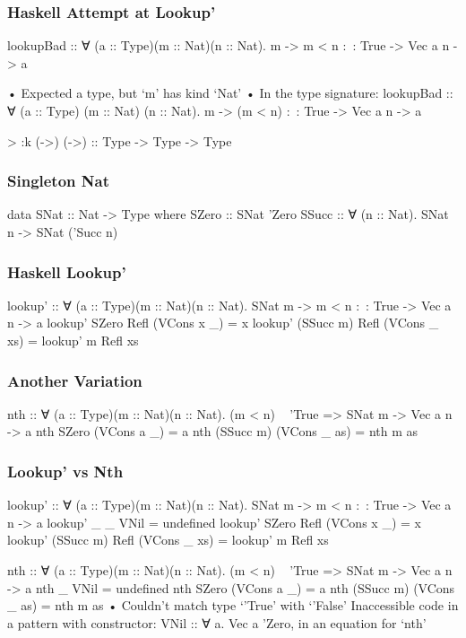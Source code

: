 \documentclass{beamer}
\begin{document}
\begin{frame}[fragile]\frametitle{Haskell Attempt at Lookup'}
\begin{semiverbatim}
lookupBad :: ∀ (a :: Type)(m :: Nat)(n :: Nat).
             m -> m < n :~: True -> Vec a n -> a

  • Expected a type, but ‘m’ has kind ‘Nat’
  • In the type signature:
      lookupBad :: ∀ (a :: Type) (m :: Nat) (n :: Nat).
                   m -> (m < n) :~: True -> Vec a n -> a

> :k (->)
(->) :: Type -> Type -> Type
\end{semiverbatim}
\end{frame}

\begin{frame}[fragile]\frametitle{Singleton Nat}
\begin{semiverbatim}
data SNat :: Nat -> Type where
  SZero :: SNat 'Zero
  SSucc :: ∀ (n :: Nat). SNat n -> SNat ('Succ n)
\end{semiverbatim}
\end{frame}

\begin{frame}[fragile]\frametitle{Haskell Lookup'}
\begin{semiverbatim}
lookup' :: ∀ (a :: Type)(m :: Nat)(n :: Nat).
           SNat m -> m < n :~: True -> Vec a n -> a
lookup' SZero     Refl (VCons x _)  = x
lookup' (SSucc m) Refl (VCons _ xs) = lookup' m Refl xs
\end{semiverbatim}
\end{frame}

\begin{frame}[fragile]\frametitle{Another Variation}
\begin{semiverbatim}
nth :: ∀ (a :: Type)(m :: Nat)(n :: Nat).
       (m < n) ~ 'True => SNat m -> Vec a n -> a
nth SZero     (VCons a _)  = a
nth (SSucc m) (VCons _ as) = nth m as
\end{semiverbatim}
\end{frame}

\begin{frame}[fragile]\frametitle{Lookup' vs Nth}
\begin{semiverbatim}
lookup' :: ∀ (a :: Type)(m :: Nat)(n :: Nat).
           SNat m -> m < n :~: True -> Vec a n -> a
lookup' _         _     VNil        = undefined
lookup' SZero     Refl (VCons x _)  = x
lookup' (SSucc m) Refl (VCons _ xs) = lookup' m Refl xs

nth :: ∀ (a :: Type)(m :: Nat)(n :: Nat).
       (m < n) ~ 'True => SNat m -> Vec a n -> a
nth _         VNil         =  undefined
nth SZero     (VCons a _)  = a
nth (SSucc m) (VCons _ as) = nth m as
  • Couldn't match type ‘'True’ with ‘'False’
    Inaccessible code in
      a pattern with constructor: VNil :: ∀ a. Vec a 'Zero,
      in an equation for ‘nth’
\end{semiverbatim}
\end{frame}

\begin{frame}[fragile]\frametitle{}
\begin{semiverbatim}
\end{semiverbatim}
\end{frame}
\end{document}
